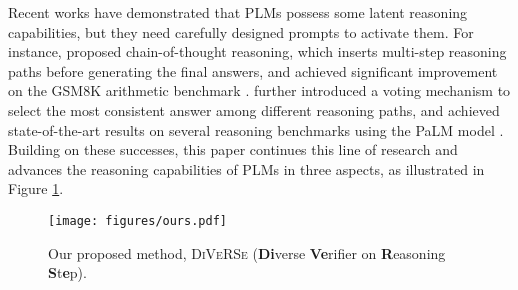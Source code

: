 \documentclass[11pt,a4paper]{article}
\begin{document}
Recent works \cite{wei2022chain,least2most,fewshotreason2022,lampinen2022can} have demonstrated that PLMs possess some latent reasoning capabilities, but they need carefully designed prompts to activate them. For instance, \citet{wei2022chain} proposed chain-of-thought reasoning, which inserts multi-step reasoning paths before generating the final answers, and achieved significant improvement on the GSM8K arithmetic benchmark \cite{cobbe2021training}. \citet{selfconsistency} further introduced a voting mechanism to select the most consistent answer among different reasoning paths, and achieved state-of-the-art results on several reasoning benchmarks using the PaLM model \cite{chowdhery2022palm}. Building on these successes, this paper continues this line of research and advances the reasoning capabilities of PLMs in three aspects, as illustrated in Figure \ref{fig:overview}.


\begin{figure}[t]
\centering
\texttt{[image: figures/ours.pdf]}
\caption{Our proposed method, \textsc{DiVeRSe} (\textbf{Di}verse \textbf{Ve}rifier on \textbf{R}easoning \textbf{S}t\textbf{e}p).} 
\label{fig:overview}
\end{figure}
\end{document}
